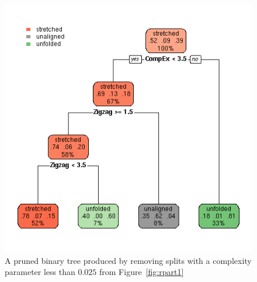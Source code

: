 %

\begin{figure}[!h]
  \centering
  \includegraphics[width=1.1\textwidth]{figrpart1p25.png}
  \caption{A pruned binary tree produced by removing splits with a complexity parameter less than $0.025$ from Figure~\ref{fig:rpart1}}
  \label{fig:rpart1p25}
\end{figure}

%

